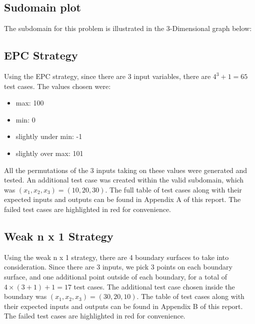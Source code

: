 \documentclass[letterpaper]{article}
\begin{document}
\subsection{Sudomain plot}
The subdomain for this problem is illustrated in the 3-Dimensional graph below:
\begin{figure}[H]
	\centering
{}
\end{figure}

\subsection{EPC Strategy}
Using the EPC strategy, since there are 3 input variables, there are
$4^3 + 1 = 65$ test cases. The values chosen were:
\begin{itemize}
	\item max: 100
	\item min: 0
	\item slightly under min: -1
	\item slightly over max: 101
\end{itemize}
All the permutations of the 3 inputs taking on these values were generated
and tested. An additional test case was created within the valid subdomain,
which was $(x_1, x_2, x_3) = (10, 20, 30)$. The full table of test cases
along with their expected inputs and outputs can be found in Appendix A of this
report. The failed test cases are highlighted in red for convenience.

\subsection{Weak n x 1 Strategy}
Using the weak n x 1 strategy, there are 4 boundary surfaces to take into
consideration. Since there are 3 inputs, we pick 3 points on each boundary
surface, and one additional point outside of each boundary, for a total of
$4\times (3 + 1) + 1 = 17$ test cases. The additional test case chosen inside
the boundary was $(x_1, x_2, x_3) = (30, 20, 10)$. The table of test cases
along with their expected inputs and outputs can be found in Appendix B of this
report. The failed test cases are highlighted in red for convenience.
\end{document}
